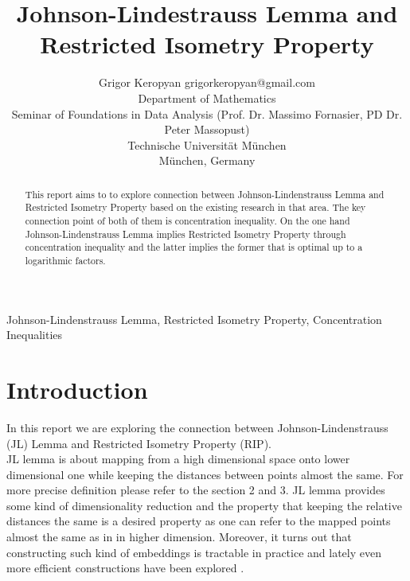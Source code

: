 \documentclass[twoside,11pt]{article}
\begin{document}
\title{Johnson-Lindestrauss Lemma and Restricted Isometry Property}

\author{\name Grigor Keropyan \email grigorkeropyan@gmail.com \\
      \addr Department of Mathematics\\
      Seminar of Foundations in Data Analysis (Prof. Dr. Massimo Fornasier, PD Dr. Peter Massopust) \\
      Technische Universität München\\
      München, Germany
    }

\maketitle

\begin{abstract}
This report aims to to explore connection between Johnson-Lindenstrauss Lemma and Restricted Isometry Property based on the existing research in that area. The key connection point of both of them is concentration inequality. On the one hand Johnson-Lindenstrauss Lemma implies Restricted Isometry Property through concentration inequality and the latter implies the former that 
is optimal up to a logarithmic factors.  \\
\end{abstract} 

\begin{keywords}
  Johnson-Lindenstrauss Lemma, Restricted Isometry Property, Concentration Inequalities
\end{keywords}

\section{Introduction}

In this report we are exploring the connection between Johnson-Lindenstrauss (JL) Lemma and Restricted Isometry Property (RIP). \\

JL lemma is about mapping from a high dimensional space onto lower dimensional one while keeping the distances between points almost the same. For more precise definition please refer to the section 2 and 3. JL lemma provides some kind of dimensionality reduction and the property that keeping the relative distances the same is a desired property as one can refer to the mapped points almost the same as in in higher dimension. Moreover, it turns out that constructing such kind of embeddings is tractable in practice and lately even more efficient constructions have been explored \citep{Khramer}. \\
\end{document}
